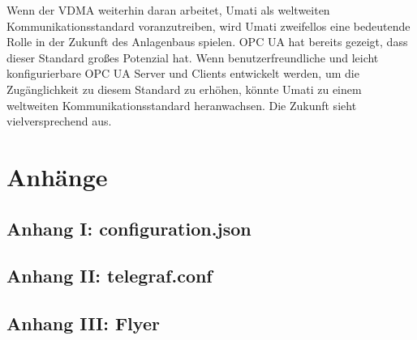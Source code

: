 \documentclass[a4paper, 12pt, oneside, toc=listofnumbered, bibliography=totoc]{scrbook}
\begin{document}
		Wenn der VDMA weiterhin daran arbeitet, Umati als weltweiten Kommunikationsstandard voranzutreiben, wird Umati zweifellos eine bedeutende Rolle in der Zukunft des Anlagenbaus spielen. OPC UA hat bereits gezeigt, dass dieser Standard großes Potenzial hat. Wenn benutzerfreundliche und leicht konfigurierbare OPC UA Server und Clients entwickelt werden, um die Zugänglichkeit zu diesem Standard zu erhöhen, könnte Umati zu einem weltweiten Kommunikationsstandard heranwachsen. Die Zukunft sieht vielversprechend aus.
	
	\printbibliography
	\frontmatter
	
	\pagebreak
	\chapter{Anhänge} %
	\section*{Anhang I: configuration.json}
	
	\pagebreak
	\section*{Anhang II: telegraf.conf}
	
	\pagebreak
	\section*{Anhang III: Flyer}
	
	\pagebreak
\end{document}
